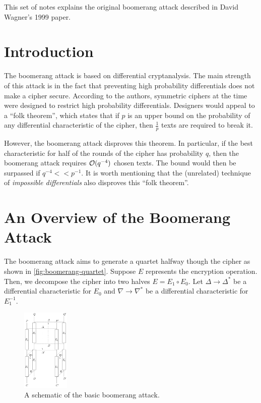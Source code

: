 \documentclass[twoside]{article}
\begin{document}



This set of notes explains the original boomerang attack described in David
Wagner's 1999 paper.

\section{Introduction}
The boomerang attack is based on differential cryptanalysis. The main strength
of this attack is in the fact that preventing high probability differentials
does not make a cipher secure. According to the authors, symmetric ciphers at
the time were designed to restrict high probability differentials. Designers
would appeal to a ``folk theorem'', which states that if \(p\) is an upper bound
on the probability of any differential characteristic of the cipher, then
\(\frac{1}{p}\) texts are required to break it.

However, the boomerang attack disproves this theorem. In particular, if the best
characteristic for half of the rounds of the cipher has probability \(q\), then
the boomerang attack requires \(\mathcal O(q^{-4})\) chosen texts. The bound would
then be surpassed if \(q^{-4} << p^{-1}\). It is worth mentioning that the
(unrelated) technique of \emph{impossible differentials} also disproves this
``folk theorem''.

\section{An Overview of the Boomerang Attack}

The boomerang attack aims to generate a quartet halfway though the cipher as
shown in \autoref{fig:boomerang-quartet}. Suppose \(E\) represents the
encryption operation. Then, we decompose the cipher into two halves \(E = E_1
\circ E_0\). Let \(\Delta \rightarrow \Delta^*\) be a differential
characteristic for \(E_0\) and \(\nabla \rightarrow \nabla^*\) be a differential
characteristic for \(E_1^{-1}\).

\begin{figure}[!ht]
    \centering
    \includegraphics[width=0.2\textwidth]{images/boomerang_quartet.png}
    \caption{A schematic of the basic boomerang attack.}
    \label{fig:boomerang-quartet}
\end{figure}
\end{document}
